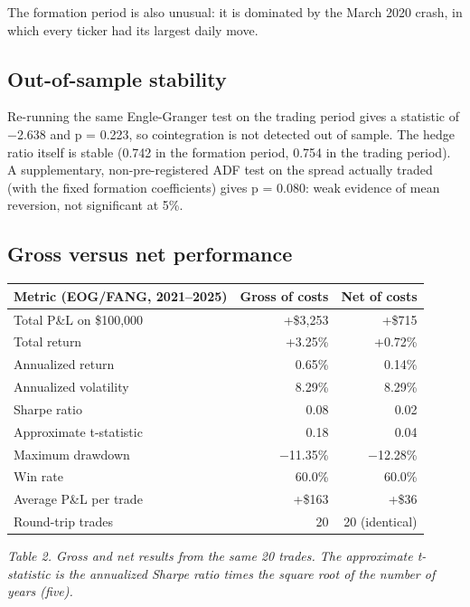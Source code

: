 \documentclass[11pt]{article}
\begin{document}
The formation period is also unusual: it is dominated by the March 2020
crash, in which every ticker had its largest daily move.

\hypertarget{out-of-sample-stability}{%
\subsection{Out-of-sample stability}\label{out-of-sample-stability}}

Re-running the same Engle-Granger test on the trading period gives a
statistic of −2.638 and p = 0.223, so cointegration is not detected
out of sample. The hedge ratio itself is stable (0.742 in the formation
period, 0.754 in the trading period). A supplementary, non-pre-registered
ADF test on the spread actually traded (with the fixed formation
coefficients) gives p = 0.080: weak evidence of mean reversion, not
significant at 5\%.

\hypertarget{gross-versus-net-performance}{%
\subsection{Gross versus net performance}\label{gross-versus-net-performance}}

\begin{longtable}[]{@{}lrr@{}}
\toprule\noalign{}
Metric (EOG/FANG, 2021--2025) & Gross of costs & Net of costs \\
\midrule\noalign{}
\endhead
\bottomrule\noalign{}
\endlastfoot
Total P\&L on \$100,000 & +\$3,253 & +\$715 \\
Total return & +3.25\% & +0.72\% \\
Annualized return & 0.65\% & 0.14\% \\
Annualized volatility & 8.29\% & 8.29\% \\
Sharpe ratio & 0.08 & 0.02 \\
Approximate t-statistic & 0.18 & 0.04 \\
Maximum drawdown & −11.35\% & −12.28\% \\
Win rate & 60.0\% & 60.0\% \\
Average P\&L per trade & +\$163 & +\$36 \\
Round-trip trades & 20 & 20 (identical) \\
\end{longtable}

\emph{Table 2. Gross and net results from the same 20 trades. The approximate
t-statistic is the annualized Sharpe ratio times the square root of the
number of years (five).}
\end{document}
